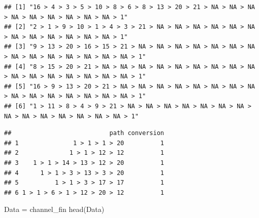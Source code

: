 \documentclass[
]{book}
\newenvironment{Shaded}{\begin{snugshade}}{\end{snugshade}}
\newcommand{\AttributeTok}[1]{\textcolor[rgb]{0.77,0.63,0.00}{#1}}
\newcommand{\ControlFlowTok}[1]{\textcolor[rgb]{0.13,0.29,0.53}{\textbf{#1}}}
\newcommand{\DecValTok}[1]{\textcolor[rgb]{0.00,0.00,0.81}{#1}}
\newcommand{\FunctionTok}[1]{\textcolor[rgb]{0.00,0.00,0.00}{#1}}
\newcommand{\NormalTok}[1]{#1}
\newcommand{\OtherTok}[1]{\textcolor[rgb]{0.56,0.35,0.01}{#1}}
\newcommand{\SpecialCharTok}[1]{\textcolor[rgb]{0.00,0.00,0.00}{#1}}
\newcommand{\StringTok}[1]{\textcolor[rgb]{0.31,0.60,0.02}{#1}}
\begin{document}
\begin{verbatim}
## [1] "16 > 4 > 3 > 5 > 10 > 8 > 6 > 8 > 13 > 20 > 21 > NA > NA > NA > NA > NA > NA > NA > NA > NA > 1"     
## [2] "2 > 1 > 9 > 10 > 1 > 4 > 3 > 21 > NA > NA > NA > NA > NA > NA > NA > NA > NA > NA > NA > NA > 1"     
## [3] "9 > 13 > 20 > 16 > 15 > 21 > NA > NA > NA > NA > NA > NA > NA > NA > NA > NA > NA > NA > NA > NA > 1"
## [4] "8 > 15 > 20 > 21 > NA > NA > NA > NA > NA > NA > NA > NA > NA > NA > NA > NA > NA > NA > NA > NA > 1"
## [5] "16 > 9 > 13 > 20 > 21 > NA > NA > NA > NA > NA > NA > NA > NA > NA > NA > NA > NA > NA > NA > NA > 1"
## [6] "1 > 11 > 8 > 4 > 9 > 21 > NA > NA > NA > NA > NA > NA > NA > NA > NA > NA > NA > NA > NA > NA > 1"
\end{verbatim}

\begin{Shaded}
\end{Shaded}

\begin{verbatim}
##                           path conversion
## 1               1 > 1 > 1 > 20          1
## 2              1 > 1 > 12 > 12          1
## 3    1 > 1 > 14 > 13 > 12 > 20          1
## 4      1 > 1 > 3 > 13 > 3 > 20          1
## 5          1 > 1 > 3 > 17 > 17          1
## 6 1 > 1 > 6 > 1 > 12 > 20 > 12          1
\end{verbatim}

\begin{Shaded}
\begin{Highlighting}[]
\NormalTok{Data }\OtherTok{=}\NormalTok{ channel\_fin}
\FunctionTok{head}\NormalTok{(Data)}
\end{Highlighting}
\end{Shaded}
\end{document}
